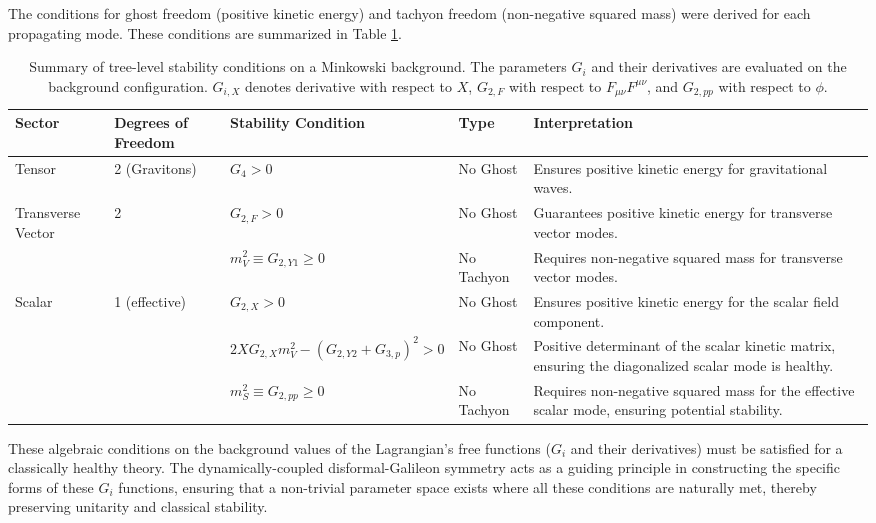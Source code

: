 \documentclass[twocolumn]{aastex631}
\begin{document}
The conditions for ghost freedom (positive kinetic energy) and tachyon freedom (non-negative squared mass) were derived for each propagating mode. These conditions are summarized in Table \ref{tab:stability_conditions}.

\begin{table}[ht!]
\caption{Summary of tree-level stability conditions on a Minkowski background. The parameters $G_i$ and their derivatives are evaluated on the background configuration. $G_{i,X}$ denotes derivative with respect to $X$, $G_{2,F}$ with respect to $F_{\mu\nu}F^{\mu\nu}$, and $G_{2,pp}$ with respect to $\phi$.}
\label{tab:stability_conditions}
\centering
\begin{tabular}{p{} p{} p{} p{} p{}}
\hline
\textbf{Sector} & \textbf{Degrees of Freedom} & \textbf{Stability Condition} & \textbf{Type} & \textbf{Interpretation} \\
\hline
Tensor & 2 (Gravitons) & $G_4 > 0$ & No Ghost & Ensures positive kinetic energy for gravitational waves. \\
Transverse Vector & 2 & $G_{2,F} > 0$ & No Ghost & Guarantees positive kinetic energy for transverse vector modes. \\
& & $m_V^2 \equiv G_{2,Y1} \ge 0$ & No Tachyon & Requires non-negative squared mass for transverse vector modes. \\
Scalar & 1 (effective) & $G_{2,X} > 0$ & No Ghost & Ensures positive kinetic energy for the scalar field component. \\
& & $2X G_{2,X} m_V^2 - (G_{2,Y2} + G_{3,p})^2 > 0$ & No Ghost & Positive determinant of the scalar kinetic matrix, ensuring the diagonalized scalar mode is healthy. \\
& & $m_S^2 \equiv G_{2,pp} \ge 0$ & No Tachyon & Requires non-negative squared mass for the effective scalar mode, ensuring potential stability. \\
\hline
\end{tabular}
\end{table}

These algebraic conditions on the background values of the Lagrangian's free functions ($G_i$ and their derivatives) must be satisfied for a classically healthy theory. The dynamically-coupled disformal-Galileon symmetry acts as a guiding principle in constructing the specific forms of these $G_i$ functions, ensuring that a non-trivial parameter space exists where all these conditions are naturally met, thereby preserving unitarity and classical stability.
\end{document}
